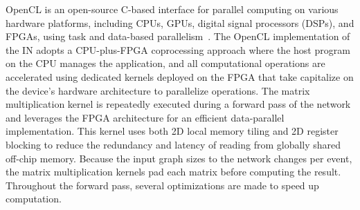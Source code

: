 \documentclass{article}
\begin{document}
OpenCL is an open-source C-based interface for parallel computing on various hardware platforms, including CPUs, GPUs, digital signal processors (DSPs), and FPGAs, using task and data-based parallelism~\cite{OpenCL}.
The OpenCL implementation of the IN adopts a CPU-plus-FPGA coprocessing approach where the host program on the CPU manages the application, and all computational operations are accelerated using dedicated kernels deployed on the FPGA that take capitalize on the device's hardware architecture to parallelize operations. 
The matrix multiplication kernel is repeatedly executed during a forward pass of the network and leverages the FPGA architecture for an efficient data-parallel implementation. 
This kernel uses both 2D local memory tiling and 2D register blocking to reduce the redundancy and latency of reading from globally shared off-chip memory. %
Because the input graph sizes to the network changes per event, the matrix multiplication kernels pad each matrix before computing the result. 
Throughout the forward pass, several optimizations are made to speed up computation. 
\end{document}
